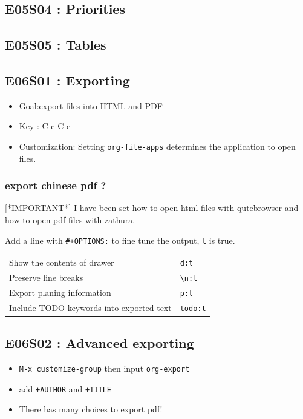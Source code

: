 \documentclass[11pt]{article}
\begin{document}
\subsection{E05S04 : Priorities}
\label{sec:org89d29c5}
\subsection{E05S05 : Tables}
\label{sec:orgf5ef284}
\subsection{E06S01 : Exporting}
\label{sec:org1506ac1}
\begin{itemize}
\item Goal:export files into HTML and PDF
\item Key : C-c C-e
\item Customization: Setting \texttt{org-file-apps} determines the application to open files.
\end{itemize}

\subsubsection{export chinese pdf ?}
\label{sec:orge68b73d}
[*IMPORTANT*] I have been set how to open html files with qutebrowser and how
to open pdf files with zathura.

Add a line with \texttt{\#+OPTIONS:} to fine tune the output, \texttt{t} is true.
\begin{center}
\begin{tabular}{ll}
Show the contents of drawer & \texttt{d:t}\\
Preserve line breaks & \texttt{\textbackslash{}n:t}\\
Export planing information & \texttt{p:t}\\
Include TODO keywords into exported text & \texttt{todo:t}\\
\end{tabular}
\end{center}

\subsection{E06S02 : Advanced exporting}
\label{sec:orgf836aea}
\begin{itemize}
\item \texttt{M-x customize-group} then input  \texttt{org-export}
\item add \texttt{+AUTHOR} and \texttt{+TITLE}
\item There has many choices to export pdf!
\end{itemize}
\end{document}
